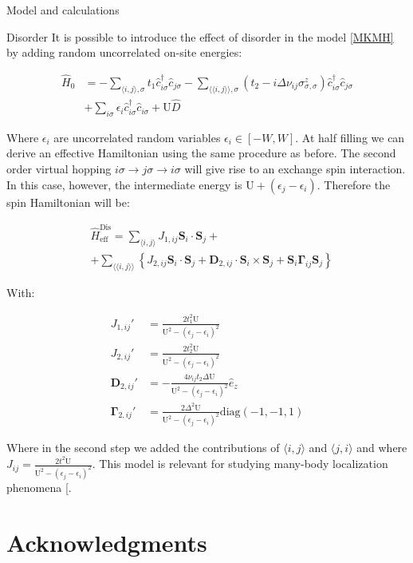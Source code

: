 \documentclass[aps,prl,twocolumn,amsmath,amssymb,superscriptaddress,nobibnotes]{revtex4-1}%
\renewcommand{\cite}[1]{{[}\onlinecite{#1}{]}}
\newcommand{\n}{\nonumber}
\newcommand{\bs}{\boldsymbol}
\begin{document}
\begin{section}{Model and calculations}
\begin{subsection}{Disorder}
It is possible to introduce the effect of disorder in the model \ref{MKMH} by adding random uncorrelated on-site energies:

\begin{align}
\label{DisorderedHubbardModel}
\hat{H}_0 &= - \sum_{\langle i,j \rangle, \sigma} t_1\hat{c}_{i \sigma}^\dagger \hat{c}_{j \sigma} -\sum_{\langle \langle i,j \rangle \rangle, \sigma}(t_2 - i\Delta\nu_{ij}\sigma^z_{\sigma, \sigma})\hat{c}_{i \sigma}^\dagger \hat{c}_{j \sigma} \n \\
	& + \sum_{i \sigma} \epsilon_i \hat{c}_{i \sigma}^\dagger \hat{c}_{i \sigma} +
	\text{U}\hat{D}
\end{align}

Where $\epsilon_i$ are uncorrelated random variables $\epsilon_i \in [-W,W]$. At half filling we can derive an effective Hamiltonian using the same procedure as before. The second order virtual hopping $i\sigma \rightarrow j\sigma \rightarrow i\sigma$ will give rise to an exchange spin interaction. In this case, however, the intermediate energy is $\text{U} + (\epsilon_j - \epsilon_i)$. Therefore the spin Hamiltonian will be:

\begin{align}
&\hat{H}_{\text{eff}}^{\text{Dis}} = \sum_{\langle i,j \rangle} J_{1,ij}\bs{S}_i\cdot\bs{S}_j +\n \\
&+ \sum_{\langle \langle i,j \rangle \rangle} \left\{ J_{2,ij}\bs{S}_i\cdot\bs{S}_j + \bs{D}_{2,ij}\cdot \bs{S}_i \times \bs{S}_j + \bs{S}_i \bs{\Gamma}_{ij} \bs{S}_j \right\}
\end{align}

With:

\begin{align*}
J_{1,ij}' &= \frac{2t_1^2\text{U}}{\text{U}^2-(\epsilon_j-\epsilon_i)^2} \\
J_{2,ij}' &= \frac{2t_2^2\text{U}}{\text{U}^2-(\epsilon_j-\epsilon_i)^2} \\
\bs{D}_{2,ij}' &= -\frac{4\nu_{ij} t_2 \Delta \text{U}}{\text{U}^2-(\epsilon_j-\epsilon_i)^2}\hat{e}_z \\
\bs{\Gamma}_{2,ij}' &= \frac{2\Delta^2\text{U}}{\text{U}^2-(\epsilon_j-\epsilon_i)^2}\text{diag}(-1,-1,1)
\end{align*}

Where in the second step we added the contributions of $\langle i,j \rangle$ and $\langle j,i \rangle$ and where $J_{ij} = \frac{2t^2\text{U}}{\text{U}^2-(\epsilon_j-\epsilon_i)^2}$. This model is relevant for studying many-body localization phenomena \cite{Protopopov2018}.
\end{subsection}

\end{section}

\section*{Acknowledgments}



\end{document}
